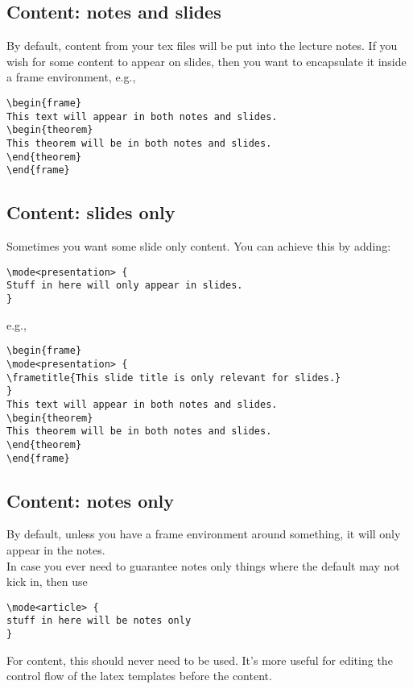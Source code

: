 \documentclass{article}
\begin{document}
\subsection{Content: notes and slides}
By default, content from your tex files will be put into the lecture notes. If
you wish for some content to appear on slides, then you want to encapsulate it
inside a frame environment,
e.g.,
\begin{verbatim}
\begin{frame}
This text will appear in both notes and slides.
\begin{theorem}
This theorem will be in both notes and slides.
\end{theorem}
\end{frame}
\end{verbatim}

\subsection{Content: slides only}
Sometimes you want some slide only content.  You can achieve this by adding:
\begin{verbatim}
\mode<presentation> {
Stuff in here will only appear in slides.
}
\end{verbatim}

e.g.,
\begin{verbatim}
\begin{frame}
\mode<presentation> {
\frametitle{This slide title is only relevant for slides.}
}
This text will appear in both notes and slides.
\begin{theorem}
This theorem will be in both notes and slides.
\end{theorem}
\end{frame}
\end{verbatim}

\subsection{Content: notes only}
By default, unless you have a frame environment around something, it will only
appear in the notes.\\

In case you ever need to guarantee notes only things where the default may not
kick in, then use
\begin{verbatim}
\mode<article> {
stuff in here will be notes only
}
\end{verbatim}

For content, this should never need to be used.  It's more useful for editing
the control flow of the latex templates before the content.
\end{document}

